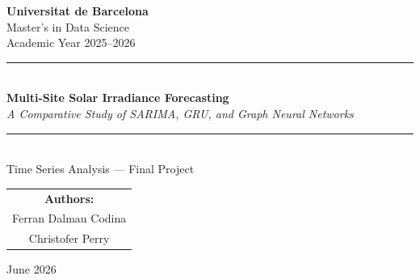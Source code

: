 \documentclass[11pt,a4paper]{article}
\begin{document}
\begin{titlepage}
    \centering
    \vspace*{2cm}
    
    {\LARGE\textbf{Universitat de Barcelona}}\\[0.5cm]
    {\Large Master's in Data Science}\\[0.3cm]
    {\large Academic Year 2025--2026}\\[2cm]
    
    \rule{\linewidth}{0.5mm}\\[0.5cm]
    {\Huge\textbf{Multi-Site Solar Irradiance Forecasting}}\\[0.3cm]
    {\Large\textit{A Comparative Study of SARIMA, GRU, and Graph Neural Networks}}\\[0.3cm]
    \rule{\linewidth}{0.5mm}\\[2cm]
    
    {\Large Time Series Analysis --- Final Project}\\[3cm]
    
    \begin{tabular}{c}
        \textbf{Authors:}\\[0.3cm]
        {\large Ferran Dalmau Codina}\\[0.2cm]
        {\large Christofer Perry}\\[1cm]
    \end{tabular}
    
    \vfill
    
    {\large June 2026}
\end{titlepage}
\end{document}

